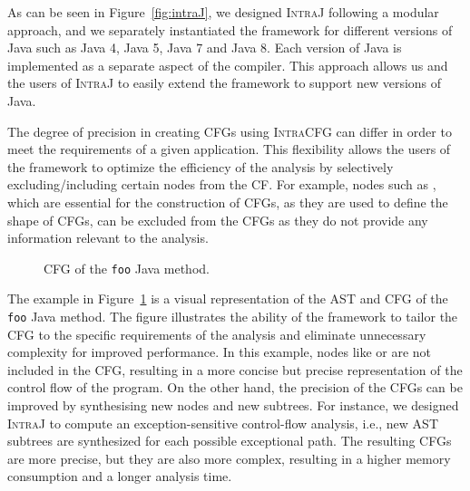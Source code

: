 As can be seen in Figure~\ref{fig:intraJ}, we designed \textsc{IntraJ}
following a  modular approach, and we separately
instantiated the framework for different versions of Java such as Java 4,
Java 5, Java 7 and Java 8. Each version of Java is implemented as a separate
aspect of the compiler. This approach allows us and the users of \textsc{IntraJ}
to easily extend the framework to support new versions of Java.

The degree of precision in creating CFGs using \textsc{IntraCFG} can differ in order
to meet the requirements of a given application.
This flexibility allows the users of the framework to optimize the efficiency of the analysis by selectively
excluding/including certain nodes from the CF.
For example, nodes such as , which are essential for the 
construction of CFGs, as they are used to define the shape of CFGs, can be excluded 
from the CFGs as they do not provide any information relevant to the analysis.
\begin{figure}[H]
	\centering
	\caption{\label{fig:CFG} CFG of the \texttt{foo} Java method.}
\end{figure}

The example in Figure~\ref{fig:CFG} is a visual representation of the AST and CFG of the
\texttt{foo} Java method. The figure illustrates the ability of the framework to tailor the CFG
to the specific requirements of the analysis and eliminate unnecessary complexity for improved performance.
In this example, nodes like  or  are not included in the CFG,
resulting in a more concise but precise representation of the control flow of the program.
On the other hand, the precision of the CFGs can be improved by synthesising new nodes and new subtrees.
For instance, we designed \textsc{IntraJ} to compute an exception-sensitive
control-flow analysis, i.e., new AST subtrees are synthesized for each possible exceptional path.
The resulting CFGs are more precise, but they are also more complex, resulting
in a higher memory consumption and a longer analysis time.



